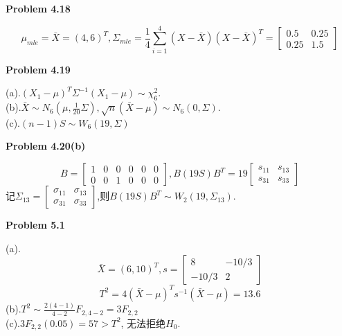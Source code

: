 \documentclass[UTF8,12pt]{article}
\newenvironment{problem}[2][Problem]
{ \begin{mdframed}[backgroundcolor=gray!20] \textbf{#1 #2}}
	{  \end{mdframed}}
\newenvironment{answer}
{}
{}
\begin{document}
\renewcommand{\qed}{\quad\qedsymbol}
\begin{problem}{4.18}
\end{problem}
\begin{answer}
	$$
	\mu_{mle}=\bar{X}=(4,6)^T, \Sigma_{mle}=
	\frac{1}{4}\sum_{i=1}^4 (X-\bar{X})(X-\bar{X})^T=
	\begin{bmatrix}
		0.5 & 0.25\\
		0.25 & 1.5
	\end{bmatrix}
	$$
\end{answer}

\begin{problem}{4.19}
\end{problem}
\begin{answer}
	(a).$(X_1-\mu)^T\Sigma^{-1}(X_1-\mu)\sim \chi^2_6$.\\
	(b).$\bar{X}\sim N_6(\mu, \frac{1}{20}\Sigma), 
	\sqrt{n}(\bar{X}-\mu)\sim N_6(0,\Sigma)$.\\
	(c).$(n-1)S \sim W_6(19,\Sigma)$
\end{answer}
\begin{problem}{4.20(b)}
\end{problem}
\begin{answer}
	$$
	B =\begin{bmatrix}
		1 & 0 & 0 & 0 & 0 & 0\\
		0 & 0 & 1 & 0 & 0 & 0
	\end{bmatrix}
	,B(19S)B^T=19\begin{bmatrix}
		s_{11} & s_{13}\\
		s_{31} & s_{33}
	\end{bmatrix}
	$$
	记$\Sigma_{13}=\begin{bmatrix}
		\sigma_{11} & \sigma_{13}\\
		\sigma_{31} & \sigma_{33}
	\end{bmatrix}
	$,则$B(19S)B^T \sim W_2(19,\Sigma_{13})$.
\end{answer}

\begin{problem}{5.1}
\end{problem}
\begin{answer}
	(a).
	$$
	\bar{X}=(6,10)^T, s=\begin{bmatrix}
		8 & -10/3\\
		-10/3 & 2
	\end{bmatrix}
	$$
	$$
	T^2 = 4(\bar{X}-\mu)^T s^{-1}(\bar{X}-\mu)=13.6
	$$
	(b).$T^2\sim \frac{2(4-1)}{4-2}F_{2,4-2}=3F_{2,2}$\\
	(c).$3F_{2,2}(0.05)=57>T^2$, 无法拒绝$H_0$.
\end{answer}
\end{document}
